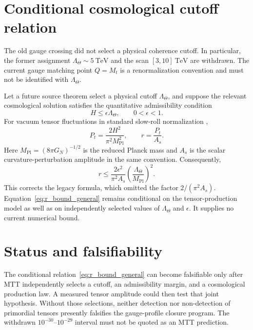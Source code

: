 \documentclass[11pt]{article}
\begin{document}
\section{Conditional cosmological cutoff relation}

The old gauge crossing did not select a physical coherence cutoff. In
particular, the former assignment $\Lambda_\Theta\sim5~\mathrm{TeV}$ and the
scan $[3,10]~\mathrm{TeV}$ are withdrawn. The current gauge matching point
$Q=M_t$ is a renormalization convention and must not be identified with
$\Lambda_\Theta$.

Let a future source theorem select a physical cutoff $\Lambda_\Theta$, and
suppose the relevant cosmological solution satisfies the quantitative
admissibility condition
\begin{equation}
H\leq\epsilon\Lambda_\Theta,
\qquad 0<\epsilon<1.
\label{eq:admissibility_H}
\end{equation}
For vacuum tensor fluctuations in standard slow-roll normalization
\cite{BaumannInflation},
\begin{equation}
P_t=\frac{2H^2}{\pi^2M_{\mathrm{Pl}}^2},
\qquad r=\frac{P_t}{A_s}.
\end{equation}
Here $M_{\mathrm{Pl}}=(8\pi G_N)^{-1/2}$ is the reduced Planck mass and
$A_s$ is the scalar curvature-perturbation amplitude in the same convention.
Consequently,
\begin{equation}
\boxed{r\leq
\frac{2\epsilon^2}{\pi^2A_s}
\left(\frac{\Lambda_\Theta}{M_{\mathrm{Pl}}}\right)^2.}
\label{eq:r_bound_general}
\end{equation}
This corrects the legacy formula, which omitted the factor
$2/(\pi^2A_s)$. Equation~\eqref{eq:r_bound_general} remains conditional on the
tensor-production model as well as on independently selected values of
$\Lambda_\Theta$ and $\epsilon$. It supplies no current numerical bound.


\section{Status and falsifiability}

The conditional relation~\eqref{eq:r_bound_general} can become falsifiable
only after MTT independently selects a cutoff, an admissibility margin, and a
cosmological production law. A measured tensor amplitude could then test that
joint hypothesis. Without those selections, neither detection nor
non-detection of primordial tensors presently falsifies the gauge-profile
closure program. The withdrawn $10^{-30}$--$10^{-29}$ interval must not be
quoted as an MTT prediction.
\end{document}
